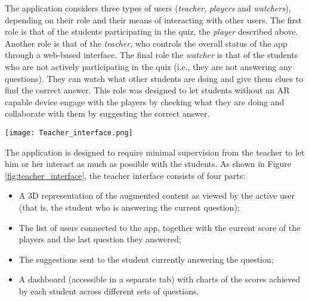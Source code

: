 

The application considers three types of users (\textit{teacher}, \textit{players} and \textit{watchers}), depending on their role and their means of interacting with other users.
The first role is that of the students participating in the quiz, \textendash{} the \textit{player} \textendash{} described above.
Another role is that of the \textit{teacher}, who controls the overall status of the app through a web-based interface.
The final role \textendash{} the \textit{watcher} \textendash{} is that of the students who are not actively participating in the quiz (i.e., they are not answering any questions). They can watch what other students are doing and give them clues to find the correct answer.
This role was designed to let students without an AR capable device engage with the players by checking what they are doing and collaborate with them by suggesting the correct answer.

\begin{figure*}[t]
    \centering
    \texttt{[image: Teacher\_interface.png]}
    \caption{\fontsize{10pt}{11pt}}
    \label{fig:teacher_interface}
\end{figure*}

The application is designed to require minimal supervision from the teacher to let him or her interact as much as possible with the students.
As shown in Figure \ref{fig:teacher_interface}, the teacher interface consists of four parts:
\begin{itemize}
    \item A 3D representation of the augmented content as viewed by the active user (that is, the student who is answering the current question);
    \item The list of users connected to the app, together with the current score of the players and the last question they answered;
    \item The suggestions sent to the student currently answering the question;
    \item A dashboard (accessible in a separate tab) with charts of the scores achieved by each student across different sets of questions.
\end{itemize} 

